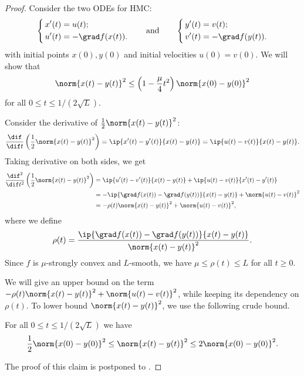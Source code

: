 \begin{proof}%
	Consider the two ODEs for HMC:
	\[
	\left\{\,
	\begin{aligned}
	x'(t) &= u(t);\\
	u'(t) &= -\grad f(x(t)).
	\end{aligned}
	\right.
	\qquad\text{and}\qquad
	\left\{\,
	\begin{aligned}
	y'(t) &= v(t);\\
	v'(t) &= -\grad f(y(t)).
	\end{aligned}
	\right.
	\]
	with initial points $x(0), y(0)$ and initial velocities $u(0) = v(0)$. 
	We will show that
	\[
	\norm{x(t)-y(t)}^2 \leq \left( 1 - \frac{\mu}{4} t^2 \right) \norm{x(0) - y(0)}^2
	\]
	for all $0 \le t \le 1/(2\sqrt{L})$. 
	
	Consider the derivative of $\frac{1}{2} \norm{x(t)-y(t)}^2$:
	\begin{equation}\label{eqn:deri_x-y}
	\frac{\dif}{\dif t} \left( \frac{1}{2} \norm{x(t)-y(t)}^2 \right) = 
	\ip{x'(t)-y'(t)}{x(t)-y(t)} = \ip{u(t)-v(t)}{x(t)-y(t)}.
	\end{equation}
	Taking derivative on both sides, we get
	\begin{align}
	\frac{\dif^2}{\dif t^2} \left( \frac{1}{2} \norm{x(t)-y(t)}^2 \right) 
  &= \ip{u'(t)-v'(t)}{x(t)-y(t)} + \ip{u(t)-v(t)}{x'(t)-y'(t)} \nonumber\\
  &= - \ip{\grad f(x(t)) - \grad f(y(t))}{x(t)-y(t)} + \norm{u(t)-v(t)}^2 \nonumber\\ 
  &= - \rho(t) \norm{x(t)-y(t)}^2 + \norm{u(t)-v(t)}^2, \label{eqn:deri2_x-y}
	\end{align}
where we define
	\[
	\rho(t) = \frac{\ip{\grad f(x(t)) - \grad f(y(t))}{x(t)-y(t)}}{\norm{x(t)-y(t)}^2}.
	\]
	Since $f$ is $\mu$-strongly convex and $L$-smooth, we have $\mu \le \rho(t) \le L$ for all $t\geq 0$.
	
We will %
give an upper bound on  %
the term $- \rho(t)\norm{x(t)-y(t)}^2 + \norm{u(t)-v(t)}^2$, while keeping its dependency on $\rho(t)$. To lower bound $\norm{x(t)-y(t)}^2$, we use the following crude bound.
	\begin{claim}
		\label{claim:crude-bound}
		For all $0 \le t \le 1/(2\sqrt{L})$ we have
		\begin{equation}\label{eqn:crude_bound}
		\frac{1}{2} \norm{x(0) - y(0)}^2 \le \norm{x(t)-y(t)}^2 \le 2 \norm{x(0) - y(0)}^2.
		\end{equation}
	\end{claim}
	\noindent
	The proof of this claim is postponed to . 
	

\end{proof}
